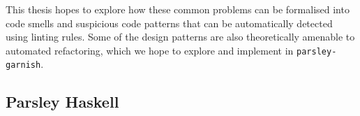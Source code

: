 \documentclass[../../main.tex]{subfiles}
\begin{document}
This thesis hopes to explore how these common problems can be formalised into code smells and suspicious code patterns that can be automatically detected using linting rules.
Some of the design patterns are also theoretically amenable to automated refactoring, which we hope to explore and implement in \texttt{parsley-garnish}.

\subsection{Parsley Haskell}
\end{document}
